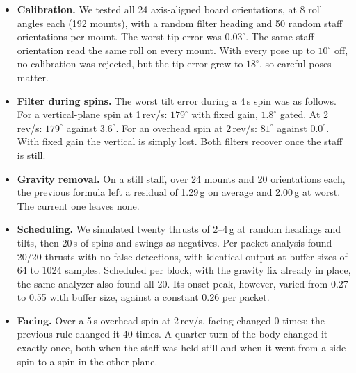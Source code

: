 \documentclass[sigconf,nonacm]{acmart}
\begin{document}
\begin{itemize}
\item \textbf{Calibration.} We tested all 24 axis-aligned board orientations, at 8 roll angles each
(192 mounts), with a random filter heading and 50 random staff orientations per mount. The worst tip
error was $0.03^\circ$. The same staff orientation read the same roll on every mount. With every pose
up to $10^\circ$ off, no calibration was rejected, but the tip error grew to $18^\circ$, so careful
poses matter.
\item \textbf{Filter during spins.} The worst tilt error during a 4\,s spin was as follows. For a
vertical-plane spin at 1\,rev/s: $179^\circ$ with fixed gain, $1.8^\circ$ gated. At 2\,rev/s:
$179^\circ$ against $3.6^\circ$. For an overhead spin at 2\,rev/s: $81^\circ$ against $0.0^\circ$.
With fixed gain the vertical is simply lost. Both filters recover once the staff is still.
\item \textbf{Gravity removal.} On a still staff, over 24 mounts and 20 orientations each, the
previous formula left a residual of 1.29\,g on average and 2.00\,g at worst. The current one leaves
none.
\item \textbf{Scheduling.} We simulated twenty thrusts of 2--4\,g at random headings and tilts, then
20\,s of spins and swings as negatives. Per-packet analysis found 20/20 thrusts with no false
detections, with identical output at buffer sizes of 64 to 1024 samples. Scheduled per block, with
the gravity fix already in place, the same analyzer also found all 20. Its onset peak, however,
varied from 0.27 to 0.55 with buffer size, against a constant 0.26 per packet.
\item \textbf{Facing.} Over a 5\,s overhead spin at 2\,rev/s, facing changed 0 times; the previous
rule changed it 40 times. A quarter turn of the body changed it exactly once, both when the staff
was held still and when it went from a side spin to a spin in the other plane.
\end{itemize}
\end{document}
